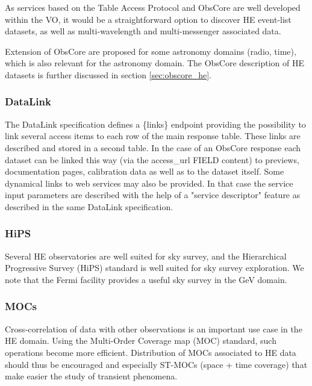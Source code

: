 \documentclass[11pt,a4paper]{ivoa}
\begin{document}
{As services based on the Table Access Protocol \citep{2019ivoa.spec.0927D} and ObsCore are well developed within the VO, it would be a straightforward option to discover HE event-list datasets, as well as multi-wavelength and multi-messenger associated data.

Extension of ObsCore are proposed for some astronomy domains (radio, time), which is also relevant for the astronomy domain. The ObsCore description of HE datasets is further discussed in section \ref{sec:obscore_he}.



\subsubsection{DataLink}


The DataLink specification \citep{2023ivoa.spec.1215B} defines a \{links\} endpoint providing the possibility to link several
access items to each row of the main response table. These links are described and stored in a second
table. In the case of an ObsCore response each dataset can be linked this way (via the access\_url
FIELD content) to previews, documentation pages, calibration data as well as to the dataset itself.
Some dynamical links to web services may also be provided. In that case the service input parameters are
described with the help of a "service descriptor" feature as described in the same DataLink specification.

\subsubsection{HiPS}

Several HE observatories are well suited for sky survey, and the Hierarchical Progressive Survey (HiPS) standard is well suited for sky survey exploration. We note that the Fermi facility provides a useful sky survey in the GeV domain.


\subsubsection{MOCs}

Cross-correlation of data with other observations is an important use case in the HE domain. Using the Multi-Order Coverage map (MOC) standard, such operations become more efficient. Distribution of MOCs associated to HE data should thus be encouraged and especially ST-MOCs (space + time coverage)
that make easier the study of transient phenomena.

}
\end{document}
